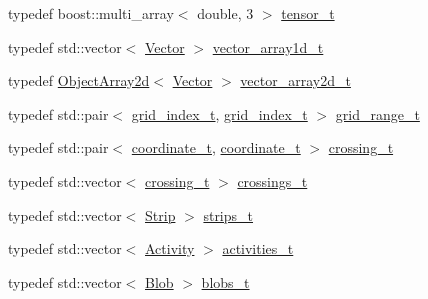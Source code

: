 \begin{DoxyCompactItemize}
\item 
typedef boost\+::multi\+\_\+array$<$ double, 3 $>$ \hyperlink{namespace_wire_cell_1_1_ray_grid_adaca791d3ebd5f5c455aa89966289111}{tensor\+\_\+t}
\item 
typedef std\+::vector$<$ \hyperlink{namespace_wire_cell_aa3c82d3ba85f032b0d278b7004846800}{Vector} $>$ \hyperlink{namespace_wire_cell_1_1_ray_grid_a0406c6b8a3dc5f9127d665b6a2e6854a}{vector\+\_\+array1d\+\_\+t}
\item 
typedef \hyperlink{class_wire_cell_1_1_object_array2d}{Object\+Array2d}$<$ \hyperlink{namespace_wire_cell_aa3c82d3ba85f032b0d278b7004846800}{Vector} $>$ \hyperlink{namespace_wire_cell_1_1_ray_grid_a5fe54fc4af050aa1782db6b9761df515}{vector\+\_\+array2d\+\_\+t}
\item 
typedef std\+::pair$<$ \hyperlink{namespace_wire_cell_1_1_ray_grid_ae97b5b26d015cd99f7d4566f3a7310d0}{grid\+\_\+index\+\_\+t}, \hyperlink{namespace_wire_cell_1_1_ray_grid_ae97b5b26d015cd99f7d4566f3a7310d0}{grid\+\_\+index\+\_\+t} $>$ \hyperlink{namespace_wire_cell_1_1_ray_grid_a4f0a195ceaa41bf0c9d13f0c81309633}{grid\+\_\+range\+\_\+t}
\item 
typedef std\+::pair$<$ \hyperlink{struct_wire_cell_1_1_ray_grid_1_1coordinate__t}{coordinate\+\_\+t}, \hyperlink{struct_wire_cell_1_1_ray_grid_1_1coordinate__t}{coordinate\+\_\+t} $>$ \hyperlink{namespace_wire_cell_1_1_ray_grid_ad8870c962588c4492b1f7c5ad1552a7e}{crossing\+\_\+t}
\item 
typedef std\+::vector$<$ \hyperlink{namespace_wire_cell_1_1_ray_grid_ad8870c962588c4492b1f7c5ad1552a7e}{crossing\+\_\+t} $>$ \hyperlink{namespace_wire_cell_1_1_ray_grid_a100185dcaa66f6b2b42c53c40c37fb49}{crossings\+\_\+t}
\item 
typedef std\+::vector$<$ \hyperlink{struct_wire_cell_1_1_ray_grid_1_1_strip}{Strip} $>$ \hyperlink{namespace_wire_cell_1_1_ray_grid_a06c9ce08c0358d22fae3185aff8a9b7c}{strips\+\_\+t}
\item 
typedef std\+::vector$<$ \hyperlink{class_wire_cell_1_1_ray_grid_1_1_activity}{Activity} $>$ \hyperlink{namespace_wire_cell_1_1_ray_grid_af748d1ae6bed1a329eb9f14dd11e2873}{activities\+\_\+t}
\item 
typedef std\+::vector$<$ \hyperlink{class_wire_cell_1_1_ray_grid_1_1_blob}{Blob} $>$ \hyperlink{namespace_wire_cell_1_1_ray_grid_aea2069aff62790df3241ee7446e81ade}{blobs\+\_\+t}
\end{DoxyCompactItemize}
